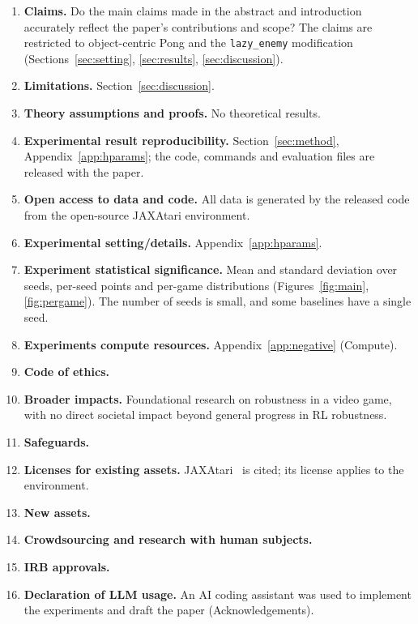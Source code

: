 \documentclass{article}
\newcommand{\lazy}{\texttt{lazy\_enemy}}
\begin{document}
\begin{enumerate}[leftmargin=*]
\item {\bf Claims.} Do the main claims made in the abstract and introduction accurately reflect the
paper's contributions and scope? \answerYes{} The claims are restricted to object-centric Pong and the
\lazy{} modification (Sections~\ref{sec:setting}, \ref{sec:results}, \ref{sec:discussion}).
\item {\bf Limitations.} \answerYes{} Section~\ref{sec:discussion}.
\item {\bf Theory assumptions and proofs.} \answerNA{} No theoretical results.
\item {\bf Experimental result reproducibility.} \answerYes{} Section~\ref{sec:method},
Appendix~\ref{app:hparams}; the code, commands and evaluation files are released with the paper.
\item {\bf Open access to data and code.} \answerYes{} All data is generated by the released code from
the open-source JAXAtari environment.
\item {\bf Experimental setting/details.} \answerYes{} Appendix~\ref{app:hparams}.
\item {\bf Experiment statistical significance.} \answerYes{} Mean and standard deviation over seeds,
per-seed points and per-game distributions (Figures~\ref{fig:main}, \ref{fig:pergame}). The number of
seeds is small, and some baselines have a single seed.
\item {\bf Experiments compute resources.} \answerYes{} Appendix~\ref{app:negative} (Compute).
\item {\bf Code of ethics.} \answerYes{}
\item {\bf Broader impacts.} \answerNA{} Foundational research on robustness in a video game, with no
direct societal impact beyond general progress in RL robustness.
\item {\bf Safeguards.} \answerNA{}
\item {\bf Licenses for existing assets.} \answerYes{} JAXAtari~\cite{jaxatari} is cited; its license
applies to the environment.
\item {\bf New assets.} \answerNA{}
\item {\bf Crowdsourcing and research with human subjects.} \answerNA{}
\item {\bf IRB approvals.} \answerNA{}
\item {\bf Declaration of LLM usage.} \answerYes{} An AI coding assistant was used to implement the
experiments and draft the paper (Acknowledgements).
\end{enumerate}
\end{document}
